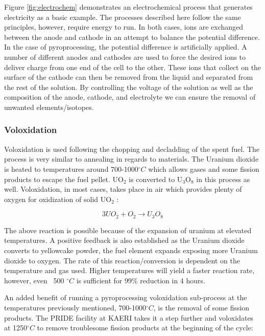 Figure \ref{fig:electrochem} demonstrates an electrochemical process that generates electricity as a basic example.
The processes described here follow the same principles, however, require energy to run.
In both cases, ions are exchanged between the anode and cathode in an attempt to balance the potential difference.
In the case of pyroprocessing, the potential difference is artificially applied.
A number of different anodes and cathodes are used to force the desired ions to deliver charge from one end of the cell to the other.
These ions that collect on the surface of the cathode can then be removed from the liquid and separated from the rest of the solution.
By controlling the voltage of the solution as well as the composition of the anode, cathode, and electrolyte we can ensure the removal of unwanted elements/isotopes.





\subsubsection{Voloxidation}
Voloxidation is used following the chopping and decladding of the spent fuel. The process is very similar to annealing in regards to materials. The Uranium dioxide is heated to temperatures around 700-1000$^\circ C$ which allows gases and some fission products to escape the fuel pellet. UO$_2$ is converted to U$_3$O$_8$ in this process as well\cite{organisation}. Voloxidation, in most cases, takes place in air which provides plenty of oxygen for oxidization of solid UO$_2$ \cite{jubin_spent_2009}:

\[ 3UO_2 + O_2 \rightarrow U_3O_8 \]

The above reaction is possible because of the expansion of uranium at elevated temperatures. A positive feedback is also established as the Uranium dioxide converts to yellowcake powder, the fuel element expands exposing more Uranium dioxide to oxygen. The rate of this reaction/conversion is dependent on the temperature and gas used. Higher temperatures will yield a faster reaction rate, however, even ~500 $^\circ C$ is sufficient for 99\% reduction in 4 hours.

An added benefit of running a pyroprocessing voloxidation sub-process at the temperatures previously mentioned, 700-1000$^\circ C$, is the removal of some fission products. The PRIDE facility at KAERI takes it a step further and voloxidates at 1250$^\circ C$ to remove troublesome fission products at the beginning of the cycle\cite{organisation}:

